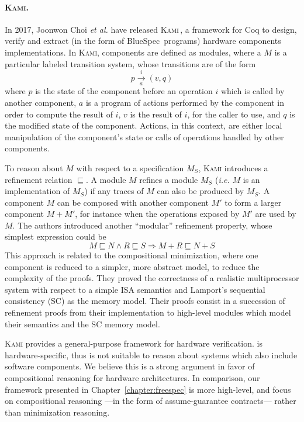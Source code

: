 \paragraph{{\scshape Kami}.}
%
In 2017, Joonwon Choi \emph{et al.} have released {\scshape
  Kami}\,\cite{choi2017kami}, a framework for Coq to design, verify and extract
(in the form of BlueSpec\,\cite{nikhil2004bluespec} programs) hardware
components implementations.
%
In {\scshape Kami}, components are defined as modules, where a \( M \) is a
particular labeled transition system, whose transitions are of the form
%
\[
  p \xrightarrow[a]{i} (v, q)
\]
%
where \( p \) is the state of the component before an operation \( i \) which is
called by another component, \( a \) is a program of actions performed by the
component in order to compute the result of \( i \), \( v \) is the result of
\( i \), for the caller to use, and \( q \) is the modified state of the
component.
%
Actions, in this context, are either local manipulation of the component's state
or calls of operations handled by other components.

To reason about \( M \) with respect to a specification \( M_S \), {\scshape
  Kami} introduces a refinement relation \( \sqsubseteq \).
%
A module \( M \) refines a module \( M_S \) (\emph{i.e.} \( M \) is an
implementation of \( M_S \)) if any traces of \( M \) can also be produced by
\( M_S \).
%
A component \( M \) can be composed with another component \( M' \) to form a
larger component \( M + M' \), for instance when the operations exposed by
\( M' \) are used by \( M \).
%
The authors introduced another ``modular'' refinement property, whose simplest
expression could be
%
\[
  M \sqsubseteq N \wedge R \sqsubseteq S \Rightarrow M + R \sqsubseteq N + S
\]
%
This approach is related to the compositional minimization, where one component
is reduced to a simpler, more abstract model, to reduce the complexity of the
proofs.
%
They proved the correctness of a realistic multiprocessor system with respect to
a simple ISA semantics and Lamport's sequential consistency (SC) as the memory model.
%
Their proofs consist in a succession of refinement proofs from their
implementation to high-level modules which model their semantics and the SC
memory model.

{\scshape Kami} provides a general-purpose framework for hardware verification.
is hardware-specific, thus is not suitable to reason about systems which also
include software components.
%
We believe this is a strong argument in favor of compositional reasoning for
hardware architectures.
%
In comparison, our framework presented in Chapter~\ref{chapter:freespec} is more
high-level, and focus on compositional reasoning ---in the form of
assume-guarantee contracts--- rather than minimization reasoning.

